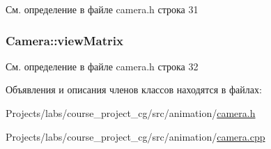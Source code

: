 См. определение в файле camera.\+h строка 31

\subsubsection[{\texorpdfstring{view\+Matrix}{viewMatrix}}]{ Camera\+::view\+Matrix\hspace{0.3cm}{\ttfamily [protected]}}\hypertarget{class_camera_a9e4efa2b0bb97699cda8904309873aa9}{}\label{class_camera_a9e4efa2b0bb97699cda8904309873aa9}


См. определение в файле camera.\+h строка 32



Объявления и описания членов классов находятся в файлах\+:\begin{DoxyCompactItemize}
\item 
Projects/labs/course\+\_\+project\+\_\+cg/src/animation/\hyperlink{camera_8h}{camera.\+h}\item 
Projects/labs/course\+\_\+project\+\_\+cg/src/animation/\hyperlink{camera_8cpp}{camera.\+cpp}\end{DoxyCompactItemize}
